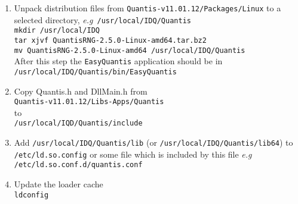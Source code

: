 \documentclass[a4paper,11pt]{article}
\newcommand{\eg}{\textsl{e.g}}
\begin{document}
\begin{enumerate}
    \item Unpack distribution files from
    \texttt{Quantis-v11.01.12/Packages/Linux} to a selected directory, \eg\
    \texttt{/usr/local/IDQ/Quantis}\\ \texttt{mkdir /usr/local/IDQ}\\
    \texttt{tar xjvf QuantisRNG-2.5.0-Linux-amd64.tar.bz2}\\ \texttt{mv
    QuantisRNG-2.5.0-Linux-amd64 /usr/local/IDQ/Quantis}\\ After this step the
    \texttt{EasyQuantis} application should be in\\
    \texttt{/usr/local/IDQ/Quantis/bin/EasyQuantis}
    \item Copy {Quantis.h} and {DllMain.h} from\\
    \texttt{Quantis-v11.01.12/Libs-Apps/Quantis}\\ to\\
    \texttt{/usr/local/IQD/Quantis/include}
    \item Add \texttt{/usr/local/IDQ/Quantis/lib} (or
    \texttt{/usr/local/IDQ/Quantis/lib64}) to \\ \texttt{/etc/ld.so.config} or
    some file which is included by this file \eg\ \\
    \texttt{/etc/ld.so.conf.d/quantis.conf}
    \item Update the loader cache\\
    \texttt{ldconfig}
\end{enumerate}
\end{document}
